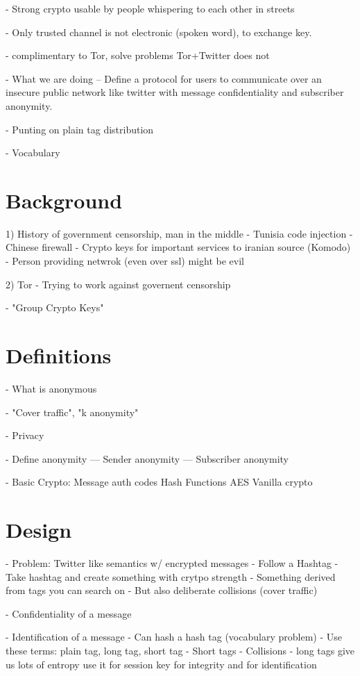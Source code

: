 \documentclass{acm_proc_article-sp}
\begin{document}
- Strong crypto usable by people whispering to each other in streets

- Only trusted channel is not electronic (spoken word), to exchange key.


- complimentary to Tor, solve problems Tor+Twitter does not




- What we are doing
-- Define a protocol for users to communicate over an insecure public network like twitter with message confidentiality and subscriber anonymity. 

- Punting on plain tag distribution

- Vocabulary

\section{Background}

1) History of government censorship, man in the middle
	- Tunisia code injection
	- Chinese firewall
	- Crypto keys for important services to iranian source (Komodo)
	- Person providing netwrok (even over ssl) might be evil

2) Tor
	- Trying to work against governent censorship
	
- "Group Crypto Keys"
	
\section{Definitions}

- What is anonymous

- "Cover traffic", "k anonymity"

- Privacy

- Define anonymity
--- Sender anonymity
--- Subscriber anonymity

- Basic Crypto:
	Message auth codes
	Hash Functions
	AES
	Vanilla crypto

\section{Design}

- Problem: Twitter like semantics w/ encrypted messages
	- Follow a Hashtag
	- Take hashtag and create something with crytpo strength
	- Something derived from tags you can search on
	- But also deliberate collisions (cover traffic)
	
- Confidentiality of a message

- Identification of a message
	- Can hash a hash tag (vocabulary problem)
		- Use these terms: plain tag, long tag, short tag
	- Short tags
	- Collisions
	- long tags give us lots of entropy use it for session key for integrity and for identification
\end{document}
